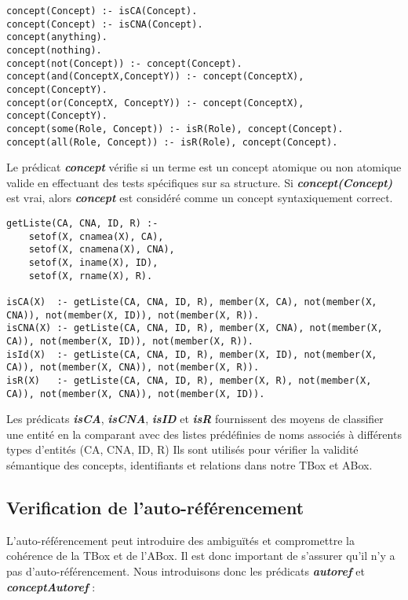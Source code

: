 \documentclass{rapportECL}
\begin{document}
\begin{lstlisting}[style=prologStyle, caption={Correction syntaxique}, label={synthaxique}]
concept(Concept) :- isCA(Concept).
concept(Concept) :- isCNA(Concept).
concept(anything).
concept(nothing).
concept(not(Concept)) :- concept(Concept).
concept(and(ConceptX,ConceptY)) :- concept(ConceptX), concept(ConceptY).
concept(or(ConceptX, ConceptY)) :- concept(ConceptX), concept(ConceptY).
concept(some(Role, Concept)) :- isR(Role), concept(Concept).
concept(all(Role, Concept)) :- isR(Role), concept(Concept).
\end{lstlisting}

Le prédicat \textbf{\textit{concept}} vérifie si un terme est un concept atomique ou non atomique valide en effectuant des tests spécifiques sur sa structure. Si \textbf{\textit{concept(Concept)}} est vrai, alors \textbf{\textit{concept}} est considéré comme un concept syntaxiquement correct.

\begin{lstlisting}[style=prologStyle, caption={Correction sémantique}, label={semantique}]
getListe(CA, CNA, ID, R) :-
    setof(X, cnamea(X), CA),
    setof(X, cnamena(X), CNA), 
    setof(X, iname(X), ID), 
    setof(X, rname(X), R).

isCA(X)  :- getListe(CA, CNA, ID, R), member(X, CA), not(member(X, CNA)), not(member(X, ID)), not(member(X, R)).
isCNA(X) :- getListe(CA, CNA, ID, R), member(X, CNA), not(member(X, CA)), not(member(X, ID)), not(member(X, R)).
isId(X)  :- getListe(CA, CNA, ID, R), member(X, ID), not(member(X, CA)), not(member(X, CNA)), not(member(X, R)).
isR(X)   :- getListe(CA, CNA, ID, R), member(X, R), not(member(X, CA)), not(member(X, CNA)), not(member(X, ID)).
\end{lstlisting}

Les prédicats \textbf{\textit{isCA}}, \textbf{\textit{isCNA}}, \textbf{\textit{isID}} et \textbf{\textit{isR}} fournissent des moyens de classifier une entité en la comparant avec des listes prédéfinies de noms associés à différents types d'entités (CA, CNA, ID, R)
Ils sont utilisés pour vérifier la validité sémantique des concepts, identifiants et relations dans notre TBox et ABox.

\newpage

\subsection{Verification de l'auto-référencement}

L'auto-référencement peut introduire des ambiguïtés et compromettre la cohérence de la TBox et de l'ABox. Il est donc important de s'assurer qu'il n'y a pas d'auto-référencement. Nous introduisons donc les prédicats \textbf{\textit{autoref}} et \textbf{\textit{conceptAutoref}} : 
\end{document}
